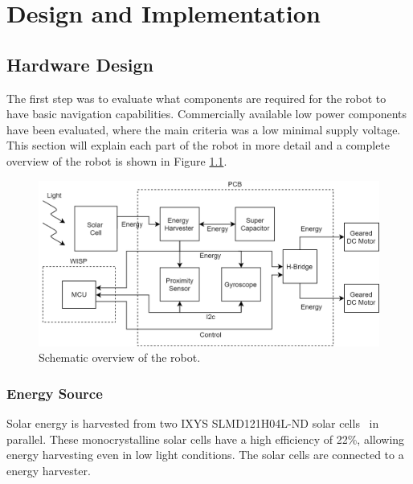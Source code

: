 \chapter{Design and Implementation}


\section{Hardware Design}


The first step was to evaluate what components are required for the robot to have basic navigation capabilities.
Commercially available low power components have been evaluated, where the main criteria was a low minimal supply voltage.
This section will explain each part of the robot in more detail and a complete overview of the robot is shown in Figure \ref{fig:robot_overview}.

\vspace{1em}
\begin{figure}[h!]
	\centering
	\includegraphics[width=\textwidth]{pics/schematic_robot_v2.png}
	\caption{Schematic overview of the robot.}
	\label{fig:robot_overview}
\end{figure}

\subsection{Energy Source}
Solar energy is harvested from two IXYS SLMD121H04L-ND solar cells~\cite{ixolar_slmd121h04l_2017} in parallel.
These monocrystalline solar cells have a high efficiency of 22\%, allowing energy harvesting even in low light conditions.
The solar cells are connected to a energy harvester. 

